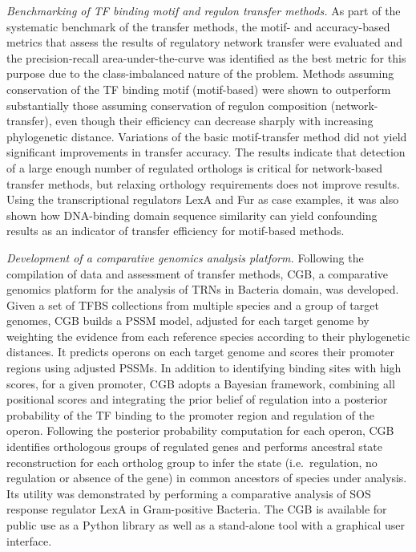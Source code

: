 \textit{Benchmarking of TF binding motif and regulon transfer methods.}
As part of the systematic benchmark of the transfer methods, the motif- and
accuracy-based metrics that assess the results of regulatory network transfer
were evaluated and the precision-recall area-under-the-curve was identified as
the best metric for this purpose due to the class-imbalanced nature of the
problem. Methods assuming conservation of the TF binding motif (motif-based)
were shown to outperform substantially those assuming conservation of regulon
composition (network-transfer), even though their efficiency can decrease
sharply with increasing phylogenetic distance. Variations of the basic
motif-transfer method did not yield significant improvements in transfer
accuracy. The results indicate that detection of a large enough number of
regulated orthologs is critical for network-based transfer methods, but
relaxing orthology requirements does not improve results. Using the
transcriptional regulators LexA and Fur as case examples, it was also shown how
DNA-binding domain sequence similarity can yield confounding results as an
indicator of transfer efficiency for motif-based methods.

\textit{Development of a comparative genomics analysis platform.} Following the
compilation of data and assessment of transfer methods, CGB, a comparative
genomics platform for the analysis of TRNs in Bacteria domain, was
developed. Given a set of TFBS collections from multiple species and a group of
target genomes, CGB builds a PSSM model, adjusted for each target genome by
weighting the evidence from each reference species according to their
phylogenetic distances. It predicts operons on each target genome and scores
their promoter regions using adjusted PSSMs. In addition to identifying binding
sites with high scores, for a given promoter, CGB adopts a Bayesian framework,
combining all positional scores and integrating the prior belief of regulation
into a posterior probability of the TF binding to the promoter region and
regulation of the operon. Following the posterior probability computation for
each operon, CGB identifies orthologous groups of regulated genes and performs
ancestral state reconstruction for each ortholog group to infer the state
(i.e.\ regulation, no regulation or absence of the gene) in common ancestors of
species under analysis. Its utility was demonstrated by performing a
comparative analysis of SOS response regulator LexA in Gram-positive
Bacteria. The CGB is available for public use as a Python library as well as a
stand-alone tool with a graphical user interface.

